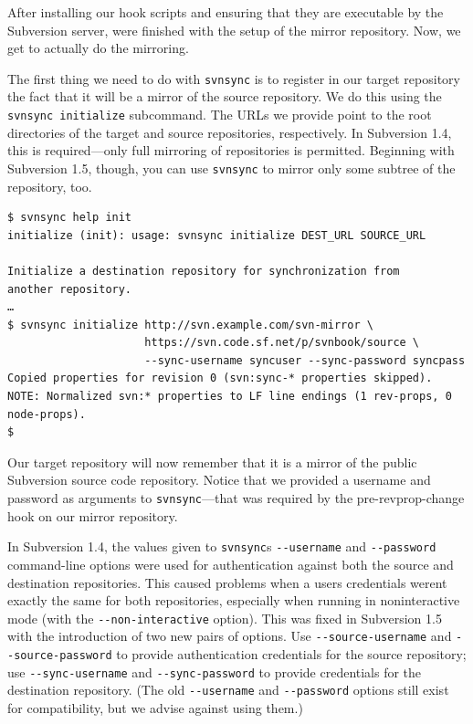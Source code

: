 After installing our hook scripts and ensuring that they are executable
by the Subversion server, we\textquotesingle re finished with the setup
of the mirror repository. Now, we get to actually do the mirroring.

The first thing we need to do with \texttt{svnsync} is to register in
our target repository the fact that it will be a mirror of the source
repository. We do this using the \texttt{svnsync\ initialize}
subcommand. The URLs we provide point to the root directories of the
target and source repositories, respectively. In Subversion 1.4, this is
required---only full mirroring of repositories is permitted. Beginning
with Subversion 1.5, though, you can use \texttt{svnsync} to mirror only
some subtree of the repository, too.

\begin{verbatim}
$ svnsync help init
initialize (init): usage: svnsync initialize DEST_URL SOURCE_URL

Initialize a destination repository for synchronization from
another repository.
…
$ svnsync initialize http://svn.example.com/svn-mirror \
                     https://svn.code.sf.net/p/svnbook/source \
                     --sync-username syncuser --sync-password syncpass
Copied properties for revision 0 (svn:sync-* properties skipped).
NOTE: Normalized svn:* properties to LF line endings (1 rev-props, 0 node-props).
$
\end{verbatim}

Our target repository will now remember that it is a mirror of the
public Subversion source code repository. Notice that we provided a
username and password as arguments to \texttt{svnsync}---that was
required by the pre-revprop-change hook on our mirror repository.

In Subversion 1.4, the values given to
\texttt{svnsync}\textquotesingle s \texttt{-\/-username} and
\texttt{-\/-password} command-line options were used for authentication
against both the source and destination repositories. This caused
problems when a user\textquotesingle s credentials
weren\textquotesingle t exactly the same for both repositories,
especially when running in noninteractive mode (with the
\texttt{-\/-non-interactive} option). This was fixed in Subversion 1.5
with the introduction of two new pairs of options. Use
\texttt{-\/-source-username} and \texttt{-\/-source-password} to provide
authentication credentials for the source repository; use
\texttt{-\/-sync-username} and \texttt{-\/-sync-password} to provide
credentials for the destination repository. (The old
\texttt{-\/-username} and \texttt{-\/-password} options still exist for
compatibility, but we advise against using them.)


